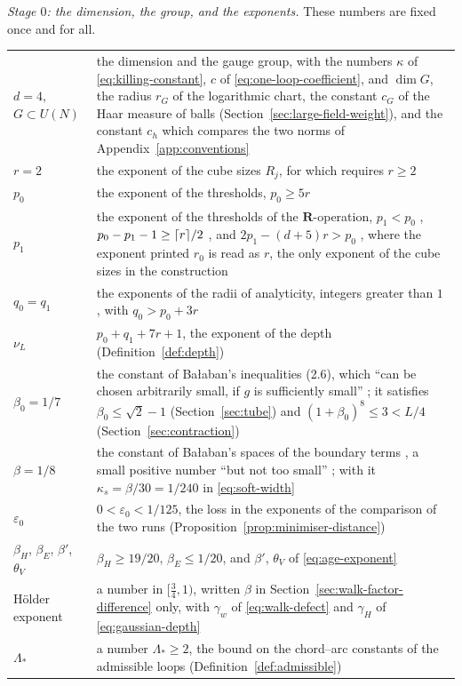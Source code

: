 \documentclass[11pt]{preprint}
\DeclarePairedDelimiter{\ceil}{\lceil}{\rceil}
\numberwithin{equation}{section}
\theoremstyle{definition}
\theoremstyle{remark}
\theoremstyle{plain}
\begin{document}
\emph{Stage $0$: the dimension, the group, and the exponents.} These numbers are fixed once and for all.
\begin{center}
\begin{tabular}{p{}p{}}
\hline
$d = 4$, $G \subset U(N)$ & the dimension and the gauge group, with the numbers $\kappa$ of \eqref{eq:killing-constant}, $c$ of \eqref{eq:one-loop-coefficient}, and $\dim G$, the radius $r_G$ of the logarithmic chart, the constant $c_G$ of the Haar measure of balls (Section~\ref{sec:large-field-weight}), and the constant $c_h$ which compares the two norms of Appendix~\ref{app:conventions} \\
$r = 2$ & the exponent of the cube sizes $R_j$, for which \cite[p.~245]{BalabanCRE} requires $r \geq 2$ \\
$p_0$ & the exponent of the thresholds, $p_0 \geq 5r$ \cite[p.~246]{BalabanCRE} \\
$p_1$ & the exponent of the thresholds of the $\mathbf R$-operation, $p_1 < p_0$ \cite[p.~183]{BalabanLFR1}, $p_0 - p_1 - 1 \geq \ceil{r}/2$ \cite[(1.94), p.~198]{BalabanLFR1}, and $2p_1 - (d + 5)r > p_0$ \cite[p.~383]{BalabanLFR2}, where the exponent printed $r_0$ is read as $r$, the only exponent of the cube sizes in the construction \\
$q_0 = q_1$ & the exponents of the radii of analyticity, integers greater than $1$ \cite[(2.28), p.~259]{BalabanCRE}, with $q_0 > p_0 + 3r$ \\
$\nu_L$ & $p_0 + q_1 + 7r + 1$, the exponent of the depth (Definition~\ref{def:depth}) \\
$\beta_0 = 1/7$ & the constant of Ba{\l}aban's inequalities (2.6), which ``can be chosen arbitrarily small, if $g$ is sufficiently small'' \cite[p.~255]{BalabanCRE}; it satisfies $\beta_0 \leq \sqrt2 - 1$ (Section~\ref{sec:tube}) and $(1 + \beta_0)^8 \leq 3 < L/4$ (Section~\ref{sec:contraction}) \\
$\beta = 1/8$ & the constant of Ba{\l}aban's spaces of the boundary terms \cite[(2.34)--(2.39), p.~261]{BalabanCRE}, a small positive number ``but not too small'' \cite[p.~261]{BalabanCRE}; with it $\kappa_s = \beta/30 = 1/240$ in \eqref{eq:soft-width} \\
$\varepsilon_0$ & $0 < \varepsilon_0 < 1/125$, the loss in the exponents of the comparison of the two runs (Proposition~\ref{prop:minimiser-distance}) \\
$\beta_H$, $\beta_E$, $\beta'$, $\theta_V$ & $\beta_H \geq 19/20$, $\beta_E \leq 1/20$, and $\beta'$, $\theta_V$ of \eqref{eq:age-exponent} \\
H\"older exponent & a number in $[\frac34, 1)$, written $\beta$ in Section~\ref{sec:walk-factor-difference} only, with $\gamma_w$ of \eqref{eq:walk-defect} and $\gamma_H$ of \eqref{eq:gaussian-depth} \\
$\Lambda_*$ & a number $\Lambda_* \geq 2$, the bound on the chord--arc constants of the admissible loops (Definition~\ref{def:admissible}) \\
\hline
\end{tabular}
\end{center}
\end{document}
